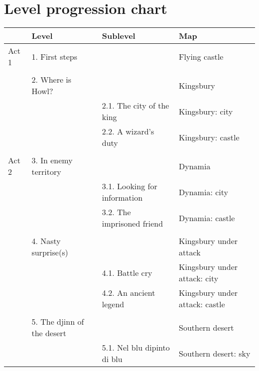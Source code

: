 \section{Level progression chart}

\begin{longtable}[H]{|p{2cm}|p{3cm}|p{3cm}|p{3cm}|}
\hline
\rowcolor[HTML]{C0C0C0} 
\multicolumn{1}{|l|}{\cellcolor[HTML]{C0C0C0}\textbf{Story act}} & \multicolumn{1}{l|}{\cellcolor[HTML]{C0C0C0}\textbf{Level}} & \multicolumn{1}{l|}{\cellcolor[HTML]{C0C0C0}\textbf{Sublevel}} & \textbf{Map} \\ \hline
\multicolumn{1}{|l|}{\cellcolor[HTML]{C0C0C0}Act 1} & \multicolumn{1}{l|}{1. First steps} & \multicolumn{1}{l|}{} & Flying castle \\ \hline
\multicolumn{1}{|l|}{} &  &  &  \\ \cline{2-4} 
 & \multicolumn{1}{l|}{2. Where is Howl?} & \multicolumn{1}{l|}{} & Kingsbury \\ \cline{2-4} 
 & \multicolumn{1}{l|}{} & \multicolumn{1}{l|}{2.1. The city of the king} & Kingsbury: city \\ \cline{3-4} 
 & \multicolumn{1}{l|}{} & \multicolumn{1}{l|}{2.2. A wizard's duty} & Kingsbury: castle \\ \hline
\multicolumn{4}{|l|}{} \\ \hline
\multicolumn{1}{|l|}{\cellcolor[HTML]{C0C0C0}Act 2} & \multicolumn{1}{l|}{3. In enemy territory} & \multicolumn{1}{l|}{} & Dynamia \\ \hline
 & \multicolumn{1}{l|}{} & \multicolumn{1}{l|}{3.1. Looking for information} & Dynamia: city \\ \cline{3-4} 
 & \multicolumn{1}{l|}{} & \multicolumn{1}{l|}{3.2. The imprisoned friend} & Dynamia: castle \\ \cline{2-4} 
 &  &  &  \\ \cline{2-4} 
 & \multicolumn{1}{l|}{4. Nasty surprise(s)} & \multicolumn{1}{l|}{} & Kingsbury under attack \\ \cline{2-4} 
 & \multicolumn{1}{l|}{} & \multicolumn{1}{l|}{4.1. Battle cry} & Kingsbury under attack: city \\ \cline{3-4} 
 & \multicolumn{1}{l|}{} & \multicolumn{1}{l|}{4.2. An ancient legend} & Kingsbury under attack: castle \\ \cline{2-4} 
 &  &  &  \\ \cline{2-4} 
 & \multicolumn{1}{l|}{5. The djinn of the desert} & \multicolumn{1}{l|}{} & Southern desert \\ \cline{2-4} 
 & \multicolumn{1}{l|}{} & \multicolumn{1}{l|}{5.1. Nel blu dipinto di blu} & Southern desert: sky \\ \cline{3-4} 

\end{longtable}
